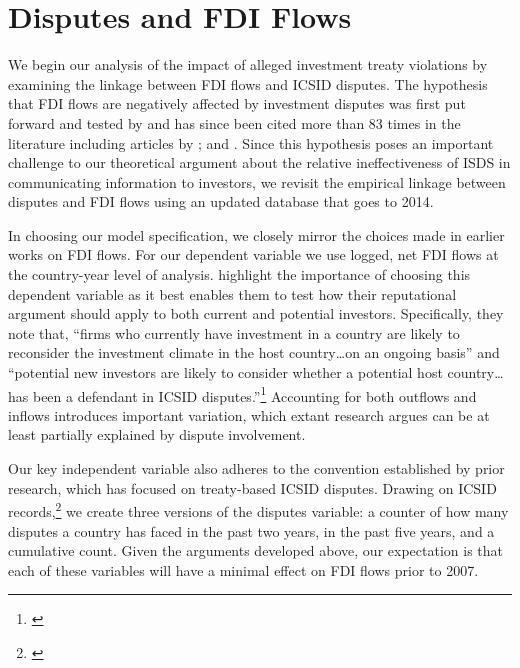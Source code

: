 \documentclass[12pt,onesided]{amsart}
\begin{document}
\section*{Disputes and FDI Flows}

We begin our analysis of the impact of alleged investment treaty violations by examining the linkage between FDI flows and ICSID disputes. The hypothesis that FDI flows are negatively affected by investment disputes was first put forward and tested by \citet{allee:peinhardt:2011} and has since been cited more than 83 times in the literature including articles by \citet{berger2011more,poulsen2013claim,wellhausen2013,haftel2013delayed,kerner2014}; and \citet{buthe:milner:2014}. Since this hypothesis poses an important challenge to our theoretical argument about the relative ineffectiveness of ISDS in communicating information to investors, we revisit the empirical linkage between disputes and FDI flows using an updated database that goes to 2014.

In choosing our model specification, we closely mirror the choices made in earlier works on FDI flows. For our dependent variable we use logged, net FDI flows at the country-year level of analysis. \citeauthor{allee:peinhardt:2011} highlight the importance of choosing this dependent variable as it best enables them to test how their reputational argument should apply to both current and potential investors. Specifically, they note that, ``firms who currently have investment in a country are likely to reconsider the investment climate in the host country\ldots on an ongoing basis'' and ``potential new investors are likely to consider whether a potential host country\ldots has been a defendant in ICSID disputes.''\footnote{\citet[p. 419--420]{allee:peinhardt:2011}} Accounting for both outflows and inflows introduces important variation, which extant research argues can be at least partially explained by dispute involvement. 

\nocite{icsid:2014}
Our key independent variable also adheres to the convention established by prior research, which has focused on treaty-based ICSID disputes. Drawing on ICSID records,\footnote{\citet[p. 7, 10]{icsid:2015}} we create three versions of the disputes variable: a counter of how many disputes a country has faced in the past two years, in the past five years, and a cumulative count. Given the arguments developed above, our expectation is that each of these variables will have a minimal effect on FDI flows prior to 2007.
\end{document}
